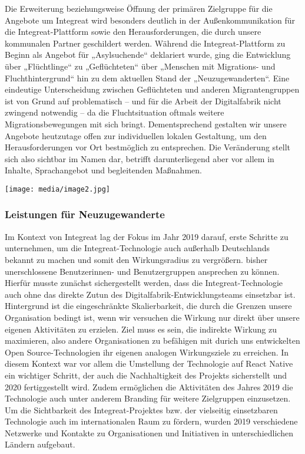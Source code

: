\documentclass[12pt, a4paper]{article} %
\begin{document}
Die Erweiterung beziehungsweise Öffnung der primären Zielgruppe für die
Angebote um Integreat wird besonders deutlich in der Außenkommunikation
für die Integreat-Plattform sowie den Herausforderungen, die durch
unsere kommunalen Partner geschildert werden. Während die
Integreat-Plattform zu Beginn als Angebot für „Asylsuchende“ deklariert
wurde, ging die Entwicklung über „Flüchtlinge“ zu „Geflüchteten“ über
„Menschen mit Migrations- und Fluchthintergrund“ hin zu dem aktuellen
Stand der „Neuzugewanderten“. Eine eindeutige Unterscheidung zwischen
Geflüchteten und anderen Migrantengruppen ist von Grund auf
problematisch – und für die Arbeit der Digitalfabrik nicht zwingend
notwendig – da die Fluchtsituation oftmals weitere Migrationsbewegungen
mit sich bringt. Dementsprechend gestalten wir unsere Angebote
heutzutage offen zur individuellen lokalen Gestaltung, um den
Herausforderungen vor Ort bestmöglich zu entsprechen. Die Veränderung
stellt sich also sichtbar im Namen dar, betrifft darunterliegend aber
vor allem in Inhalte, Sprachangebot und begleitenden Maßnahmen.

\texttt{[image: media/image2.jpg]}

\hypertarget{leistungen-fuxfcr-neuzugewanderte}{%
\subsubsection{Leistungen für
Neuzugewanderte}\label{leistungen-fuxfcr-neuzugewanderte}}

Im Kontext von Integreat lag der Fokus im Jahr 2019 darauf, erste
Schritte zu unternehmen, um die Integreat-Technologie auch außerhalb
Deutschlands bekannt zu machen und somit den Wirkungsradius zu
vergrößern. bisher unerschlossene Benutzerinnen- und Benutzergruppen
ansprechen zu können. Hierfür musste zunächst sichergestellt werden,
dass die Integreat-Technologie auch ohne das direkte Zutun des
Digitalfabrik-Entwicklungsteams einsetzbar ist. Hintergrund ist die
eingeschränkte Skalierbarkeit, die durch die Grenzen unsere Organisation
bedingt ist, wenn wir versuchen die Wirkung nur direkt über unsere
eigenen Aktivitäten zu erzielen. Ziel muss es sein, die indirekte
Wirkung zu maximieren, also andere Organisationen zu befähigen mit
durich uns entwickelten Open Source-Technologien ihr eigenen analogen
Wirkungsziele zu erreichen. In diesem Kontext war vor allem die
Umstellung der Technologie auf React Native ein wichtiger Schritt, der
auch die Nachhaltigkeit des Projekts sicherstellt und 2020
fertiggestellt wird. Zudem ermöglichen die Aktivitäten des Jahres 2019
die Technologie auch unter anderem Branding für weitere Zielgruppen
einzusetzen. Um die Sichtbarkeit des Integreat-Projektes bzw. der
vielseitig einsetzbaren Technologie auch im internationalen Raum zu
fördern, wurden 2019 verschiedene Netzwerke und Kontakte zu
Organisationen und Initiativen in unterschiedlichen Ländern aufgebaut.
\end{document}
